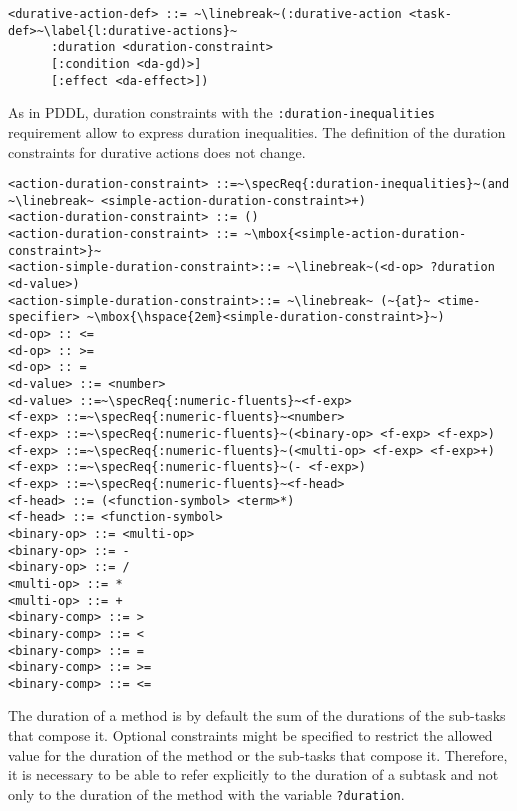 \documentclass[letterpaper]{article} %
\begin{document}
\begin{lstlisting}[firstnumber=last, escapechar=~]
<durative-action-def> ::= ~\linebreak~(:durative-action <task-def>~\label{l:durative-actions}~
      :duration <duration-constraint>
      [:condition <da-gd)>]
      [:effect <da-effect>])
\end{lstlisting}


%
%
As in PDDL, duration constraints with the \verb|:duration-inequalities| requirement allow to express duration inequalities. The definition of the duration constraints for durative actions does not change.

\begin{lstlisting}[firstnumber=last, escapechar=~]
<action-duration-constraint> ::=~\specReq{:duration-inequalities}~(and ~\linebreak~ <simple-action-duration-constraint>+)
<action-duration-constraint> ::= ()
<action-duration-constraint> ::= ~\mbox{<simple-action-duration-constraint>}~
<action-simple-duration-constraint>::= ~\linebreak~(<d-op> ?duration <d-value>)
<action-simple-duration-constraint>::= ~\linebreak~ (~{at}~ <time-specifier> ~\mbox{\hspace{2em}<simple-duration-constraint>}~)
<d-op> :: <=
<d-op> :: >=
<d-op> :: =
<d-value> ::= <number>
<d-value> ::=~\specReq{:numeric-fluents}~<f-exp>
<f-exp> ::=~\specReq{:numeric-fluents}~<number>
<f-exp> ::=~\specReq{:numeric-fluents}~(<binary-op> <f-exp> <f-exp>)
<f-exp> ::=~\specReq{:numeric-fluents}~(<multi-op> <f-exp> <f-exp>+)
<f-exp> ::=~\specReq{:numeric-fluents}~(- <f-exp>)
<f-exp> ::=~\specReq{:numeric-fluents}~<f-head>
<f-head> ::= (<function-symbol> <term>*)
<f-head> ::= <function-symbol>
<binary-op> ::= <multi-op>
<binary-op> ::= -
<binary-op> ::= /
<multi-op> ::= *
<multi-op> ::= +
<binary-comp> ::= >
<binary-comp> ::= <
<binary-comp> ::= =
<binary-comp> ::= >=
<binary-comp> ::= <=
\end{lstlisting}

%
%
The duration of a method is by default the sum of the durations of the sub-tasks that compose it. Optional constraints might be specified to restrict the allowed value for the
duration of the method or the sub-tasks that compose it. Therefore, it is necessary to be able to refer explicitly to the duration of a subtask and not only to the duration of the method with the variable {\tt ?duration}.
\end{document}
